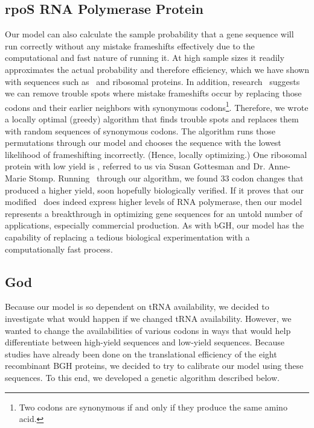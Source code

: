 \documentclass[12pt, draft]{article}
\numberwithin{equation}{section}
\begin{document}
\subsection{rpoS RNA Polymerase Protein}
Our model can also calculate the sample probability that a gene sequence will run correctly without any mistake frameshifts
effectively due to the computational and fast nature of running it.
At high sample sizes it readily approximates the actual probability and therefore efficiency, which we have shown with sequences such as
\prfB\ and ribosomal proteins. In addition, research~\cite{rare:yield}
suggests we can remove trouble spots where mistake frameshifts occur by replacing those codons and their
earlier neighbors with synonymous codons\footnote{Two codons are synonymous if and only if they produce the same amino acid.}.
Therefore, we wrote a locally optimal (greedy) algorithm that finds trouble spots and replaces them with random sequences
of synonymous codons. The algorithm runs those permutations through our model and chooses the
sequence with the lowest likelihood of frameshifting incorrectly. (Hence, locally optimizing.) One ribosomal protein with
low yield is \rpoS, referred to us via Susan Gottesman and Dr. Anne-Marie Stomp.
Running \rpoS\ through our algorithm, we found 33 codon changes that produced a higher yield, soon hopefully biologically verified.
If it proves that our modified \rpoS\ does indeed express higher levels
of RNA polymerase, then our model represents a breakthrough in optimizing gene sequences for an untold number of  applications,
especially commercial production. As with bGH, our model has the capability of replacing a tedious biological experimentation
with a computationally fast process.

\subsection{God}
Because our model is so dependent on tRNA availability, we decided to investigate what would happen if we changed tRNA availability.  However, we wanted to change the availabilities of various codons in ways that would help differentiate between high-yield sequences and low-yield sequences.  Because studies have already been done on the translational efficiency of the eight recombinant BGH proteins, we decided to try to calibrate our model using these sequences.  To this end, we developed a genetic algorithm described below.
\end{document}

